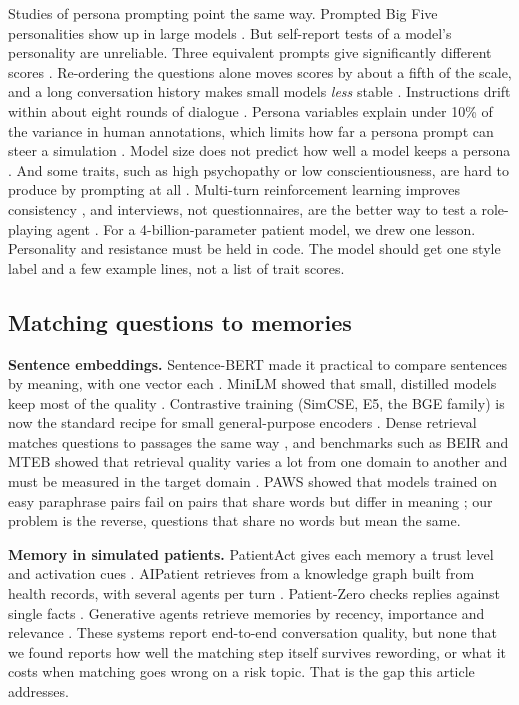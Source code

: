 \documentclass[journal]{IEEEtran}
\begin{document}
Studies of persona prompting point the same way. Prompted Big Five personalities show up in large models \cite{jiang2024personallm,serapio2023personality}. But self-report tests of a model's personality are unreliable. Three equivalent prompts give significantly different scores \cite{gupta2023selfassessment}. Re-ordering the questions alone moves scores by about a fifth of the scale, and a long conversation history makes small models \emph{less} stable \cite{tosato2025persist}. Instructions drift within about eight rounds of dialogue \cite{li2024instruction}. Persona variables explain under 10\% of the variance in human annotations, which limits how far a persona prompt can steer a simulation \cite{hu2024persona}. Model size does not predict how well a model keeps a persona \cite{samuel2025personagym}. And some traits, such as high psychopathy or low conscientiousness, are hard to produce by prompting at all \cite{lee2025trait}. Multi-turn reinforcement learning improves consistency
\cite{abdulhai2025consistent}, and interviews, not questionnaires, are the better way to test a role-playing agent \cite{wang2023incharacter}. For a 4-billion-parameter patient model, we drew one lesson. Personality and resistance must be held in code. The model should get one style label and a few example lines, not a list of trait scores.


\subsection{Matching questions to memories}


\textbf{Sentence embeddings.} Sentence-BERT made it practical to compare sentences by meaning, with one vector each \cite{reimers2019sentencebert}. MiniLM showed that small, distilled models keep most of the quality \cite{wang2020minilm}. Contrastive training (SimCSE, E5, the BGE family) is now the standard recipe for small general-purpose encoders \cite{gao2021simcse,wang2022e5,xiao2023cpack}. Dense retrieval matches questions to
passages the same way \cite{karpukhin2020dpr}, and benchmarks such as BEIR and MTEB showed that retrieval quality varies a lot from one domain to
another and must be measured in the target domain \cite{thakur2021beir,muennighoff2022mteb}. PAWS showed that models trained on easy paraphrase
pairs fail on pairs that share words but differ in meaning \cite{zhang2019paws}; our problem is the reverse, questions that share no words but
mean the same.

\textbf{Memory in simulated patients.} PatientAct gives each memory a trust level and activation cues \cite{sabour2026patientact}. AIPatient retrieves from a knowledge graph built from health records, with several agents per turn \cite{yu2024simulated}. Patient-Zero checks replies against single facts \cite{lai2025patientzero}. Generative agents retrieve memories by recency, importance and relevance \cite{park2023generative}.
These systems report end-to-end conversation quality, but none that we found reports how well the matching step itself survives rewording, or what
it costs when matching goes wrong on a risk topic. That is the gap this article addresses.
\end{document}
